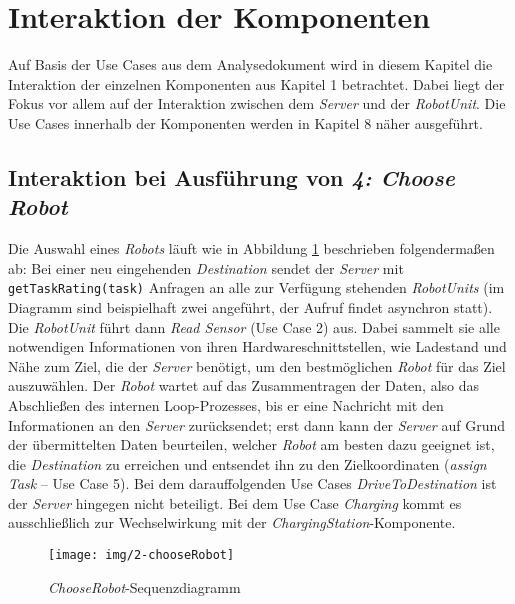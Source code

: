 \section{Interaktion der Komponenten}
Auf Basis der Use Cases aus dem Analysedokument wird in diesem Kapitel die Interaktion der einzelnen Komponenten aus Kapitel 1 betrachtet. Dabei liegt der Fokus vor allem auf der Interaktion zwischen dem \emph{Server} und der \emph{RobotUnit}. Die Use Cases innerhalb der Komponenten werden in Kapitel 8 näher ausgeführt.\\


\subsection*{Interaktion bei Ausführung von \emph{4: Choose Robot}}

Die Auswahl eines \emph{Robots} läuft wie in Abbildung \ref{SequenzDiagrammInteraktion} beschrieben folgendermaßen ab: Bei einer neu eingehenden \emph{Destination} sendet der \emph{Server} mit \texttt{getTaskRating(task)} Anfragen an alle zur Verfügung stehenden \emph{RobotUnits} (im Diagramm sind beispielhaft zwei angeführt, der Aufruf findet asynchron statt). Die \emph{RobotUnit} führt dann \emph{Read Sensor} (Use Case 2) aus. Dabei sammelt sie alle notwendigen Informationen von ihren Hardwareschnittstellen, wie Ladestand und Nähe zum Ziel, die der \emph{Server} benötigt, um den bestmöglichen \emph{Robot} für das Ziel auszuwählen. Der \emph{Robot} wartet auf das Zusammentragen der Daten, also das Abschließen des internen Loop-Prozesses, bis er eine Nachricht mit den Informationen an den \emph{Server} zurücksendet; erst dann kann der \emph{Server} auf Grund der übermittelten Daten beurteilen, welcher \emph{Robot} am besten dazu geeignet ist, die \emph{Destination} zu erreichen und entsendet ihn zu den Zielkoordinaten (\emph{assign Task} – Use Case 5). Bei dem darauffolgenden Use Cases \emph{DriveToDestination} ist der \emph{Server} hingegen nicht beteiligt. Bei dem Use Case \emph{Charging} kommt es ausschließlich zur Wechselwirkung mit der \emph{ChargingStation}-Komponente.

\begin{figure}[H]
	\centering
	\texttt{[image: img/2-chooseRobot]}
	\caption{\emph{ChooseRobot}-Sequenzdiagramm}
	\label{SequenzDiagrammInteraktion}
\end{figure}
